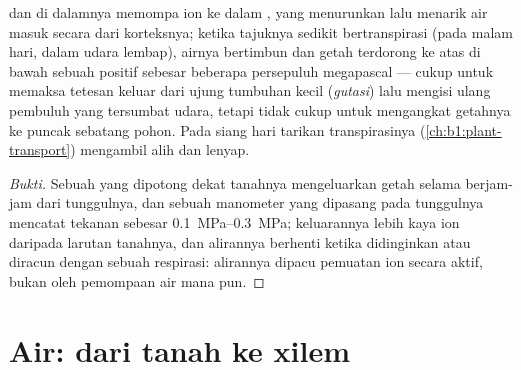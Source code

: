 \begin{proposition}\label{prop:b1:plant-water-minerals:rootpressure}
 dan  di dalamnya memompa ion ke dalam , yang
menurunkan   lalu menarik air masuk secara
 dari korteksnya; ketika tajuknya sedikit bertranspirasi (pada
malam hari, dalam udara lembap), airnya bertimbun dan getah 
terdorong ke atas di bawah sebuah \emph{} positif sebesar
beberapa persepuluh megapascal --- cukup untuk memaksa tetesan keluar
dari ujung  tumbuhan kecil (\emph{gutasi}) lalu mengisi ulang
pembuluh yang tersumbat udara, tetapi tidak cukup untuk mengangkat
getahnya ke puncak sebatang pohon. Pada siang hari tarikan
transpirasinya (\cref{ch:b1:plant-transport}) mengambil alih dan
 lenyap.
\end{proposition}
\begin{proof}[Bukti]
Sebuah  yang dipotong dekat tanahnya mengeluarkan getah selama
berjam-jam dari tunggulnya, dan sebuah manometer yang dipasang pada
tunggulnya mencatat tekanan sebesar \qtyrange{0.1}{0.3}{MPa};
keluarannya lebih kaya ion daripada larutan tanahnya, dan alirannya
berhenti ketika  didinginkan atau diracun dengan sebuah
 respirasi: alirannya dipacu pemuatan ion secara aktif,
bukan oleh pemompaan air mana pun.
\end{proof}

\section{Air: dari tanah ke xilem}

